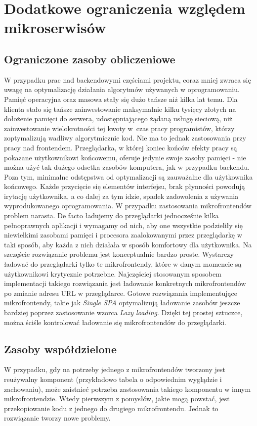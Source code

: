 \documentclass{SGGW-thesis}
\begin{document}
{\section{Dodatkowe ograniczenia względem mikroserwisów}
\subsection{Ograniczone zasoby obliczeniowe}
W przypadku prac nad backendowymi częściami projektu, coraz mniej zwraca się uwagę na optymalizację działania algorytmów używanych w oprogramowaniu. Pamięć operacyjna oraz masowa stały się dużo tańsze niż kilka lat temu. Dla klienta stało się tańsze zainwestowanie maksymalnie kilku tysięcy złotych na dołożenie pamięci do serwera, udostępniającego żądaną usługę sieciową, niż zainwestowanie wielokrotności tej kwoty w~czas pracy programistów, którzy zoptymalizują wadliwy algorytmicznie kod.
Nie ma to jednak zastosowania przy pracy nad frontendem. Przeglądarka, w której koniec końców efekty pracy są pokazane użytkownikowi końcowemu, oferuje jedynie swoje zasoby pamięci - nie można użyć tak dużego odsetka zasobów komputera, jak w przypadku backendu. Poza tym, minimalne odstępstwa od optymalizacji są zauważalne dla użytkownika końcowego. Każde przycięcie się elementów interfejsu, brak płynności powodują irytację użytkownika, a co dalej za tym idzie, spadek zadowolenia z używania wyprodukowanego oprogramowania. W przypadku zastosowania mikrofrontendów problem narasta. De facto ładujemy do przeglądarki jednocześnie kilka pełnoprawnych aplikacji i wymagamy od nich, aby one wszystkie podzieliły się niewielkimi zasobami pamięci i procesora zaalokowanymi przez przeglądarkę w taki sposób, aby każda z nich działała w sposób komfortowy dla użytkownika. Na szczęście rozwiązanie problemu jest konceptualnie bardzo proste. Wystarczy ładować do przeglądarki tylko te mikrofrontendy, które w danym momencie są użytkownikowi krytycznie potrzebne. Najczęściej stosowanym sposobem implementacji takiego rozwiązania jest ładowanie konkretnych mikrofrontendów po zmianie adresu URL w przeglądarce. Gotowe rozwiązania implementujące mikrofrontendy, takie jak \textit{Single SPA} optymalizują ładowanie zasobów jeszcze bardziej poprzez zastosowanie wzorca \textit{Lazy loading}. Dzięki tej prostej sztuczce, można ściśle kontrolować ładowanie się mikrofrontendów do przeglądarki.

\subsection{Zasoby współdzielone}
W przypadku, gdy na potrzeby jednego z mikrofrontendów tworzony jest reużywalny komponent (przykładowo tabela o odpowiednim wyglądzie i zachowaniu), może zaistnieć potrzeba zastosowania takiego komponentu w innym mikrofrontendzie. Wtedy pierwszym z pomysłów, jakie mogą powstać, jest przekopiowanie kodu z jednego do drugiego mikrofrontendu. Jednak to rozwiązanie tworzy nowe problemy.

}
\end{document}
